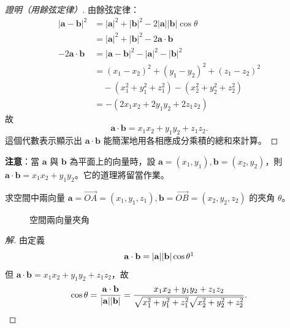 \begin{proof}[證明（用餘弦定律）]
由餘弦定律：
\begin{align*}
|\mathbf{a} - \mathbf{b}|^2 &= |\mathbf{a}|^2 + |\mathbf{b}|^2 - 2|\mathbf{a}||\mathbf{b}|\cos\theta \\
&= |\mathbf{a}|^2 + |\mathbf{b}|^2 - 2\mathbf{a}\cdot\mathbf{b} \\
-2\mathbf{a}\cdot\mathbf{b} &= |\mathbf{a} - \mathbf{b}|^2 - |\mathbf{a}|^2 - |\mathbf{b}|^2 \\
&= (x_1 - x_2)^2 + (y_1 - y_2)^2 + (z_1 - z_2)^2 \\
&\quad - (x_1^2 + y_1^2 + z_1^2) - (x_2^2 + y_2^2 + z_2^2) \\
&= -(2x_1 x_2 + 2y_1 y_2 + 2z_1 z_2)
\end{align*}
故
\[ \mathbf{a}\cdot\mathbf{b} = x_1 x_2 + y_1 y_2 + z_1 z_2. \]
這個代數表示顯示出 $\mathbf{a}\cdot\mathbf{b}$ 能簡潔地用各相應成分乘積的總和來計算。\qedhere
\end{proof}

\textbf{注意}：當 $\mathbf{a}$ 與 $\mathbf{b}$ 為平面上的向量時，設 $\mathbf{a} = (x_1, y_1), \mathbf{b} = (x_2, y_2)$，則 $\mathbf{a}\cdot\mathbf{b} = x_1 x_2 + y_1 y_2$。它的道理將留當作業。

\begin{example}[論例 9]
求空間中兩向量 $\mathbf{a} = \vec{OA} = (x_1, y_1, z_1), \mathbf{b} = \vec{OB} = (x_2, y_2, z_2)$ 的夾角 $\theta$。
\end{example}

\begin{figure}[H]
\centering
{}
\caption{空間兩向量夾角}
\label{fig:b3s-fig3-39}
\end{figure}

\begin{proof}[解]
\label{note:b3s-ch3-p113-cos-theta-typo}%
由定義
\[ \mathbf{a}\cdot\mathbf{b} = |\mathbf{a}||\mathbf{b}|\cos\theta\footnotemark \]
但 $\mathbf{a}\cdot\mathbf{b} = x_1 x_2 + y_1 y_2 + z_1 z_2$，故
\[ \cos\theta = \frac{\mathbf{a}\cdot\mathbf{b}}{|\mathbf{a}||\mathbf{b}|} = \frac{x_1 x_2 + y_1 y_2 + z_1 z_2}{\sqrt{x_1^2 + y_1^2 + z_1^2}\sqrt{x_2^2 + y_2^2 + z_2^2}}. \qedhere \]
\end{proof}

